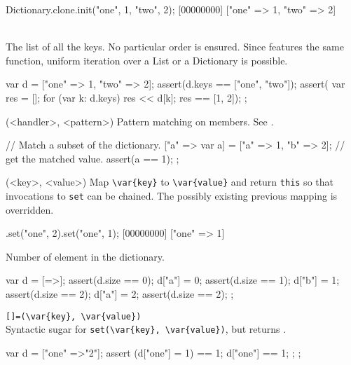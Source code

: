 \begin{urbiscriptapi}
\begin{urbiscript}
Dictionary.clone.init("one", 1, "two", 2);
[00000000] ["one" => 1, "two" => 2]
\end{urbiscript}

\item[keys]\\
  The list of all the keys.  No particular order is ensured.  Since
   features the same function, uniform iteration over
  a List or a Dictionary is possible.
\begin{urbiscript}
{
  var d = ["one" => 1, "two" => 2];
  assert(d.keys == ["one", "two"]);
  assert({
           var res = [];
           for (var k: d.keys)
             res << d[k];
           res
         }
         == [1, 2]);
};
\end{urbiscript}

\item[matchAgainst](<handler>, <pattern>)
  Pattern matching on members.  See .

\begin{urbiscript}
{
  // Match a subset of the dictionary.
  ["a" => var a] = ["a" => 1, "b" => 2];
  // get the matched value.
  assert(a == 1);
};
\end{urbiscript}

\item[set](<key>, <value>)
  Map \lstinline|\var{key}| to \lstinline|\var{value}| and return
  \lstinline|this| so that invocations to \lstinline|set| can be
  chained.  The possibly existing previous mapping is overridden.

\begin{urbiscript}
[=>].set("one", 2).set("one", 1);
[00000000] ["one" => 1]
\end{urbiscript}

\item[size]
  Number of element in the dictionary.

\begin{urbiscript}
{
  var d = [=>];
  assert(d.size == 0);
  d["a"] = 0;
  assert(d.size == 1);
  d["b"] = 1;
  assert(d.size == 2);
  d["a"] = 2;
  assert(d.size == 2);
};
\end{urbiscript}

\item \lstinline|[]=(\var{key}, \var{value})|\\
  Syntactic sugar for \lstinline|set(\var{key}, \var{value})|, but
  returns .

\begin{urbiscript}
{
  var d = ["one" =>"2"];
  assert
  {
    (d["one"] = 1) == 1;
    d["one"] == 1;
  };
};
\end{urbiscript}


\end{urbiscriptapi}
